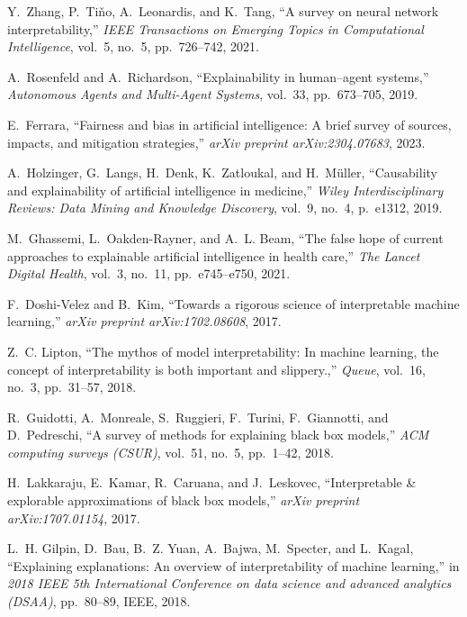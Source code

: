 \documentclass{article}
\begin{document}
\begin{thebibliography}{100}
	Y.~Zhang, P.~Ti{\v{n}}o, A.~Leonardis, and K.~Tang, ``A survey on neural
	network interpretability,'' {\em IEEE Transactions on Emerging Topics in
		Computational Intelligence}, vol.~5, no.~5, pp.~726--742, 2021.
	
	A.~Rosenfeld and A.~Richardson, ``Explainability in human--agent systems,''
	{\em Autonomous Agents and Multi-Agent Systems}, vol.~33, pp.~673--705, 2019.
	
	E.~Ferrara, ``Fairness and bias in artificial intelligence: A brief survey of
	sources, impacts, and mitigation strategies,'' {\em arXiv preprint
		arXiv:2304.07683}, 2023.
	
	A.~Holzinger, G.~Langs, H.~Denk, K.~Zatloukal, and H.~M{\"u}ller, ``Causability
	and explainability of artificial intelligence in medicine,'' {\em Wiley
		Interdisciplinary Reviews: Data Mining and Knowledge Discovery}, vol.~9,
	no.~4, p.~e1312, 2019.
	
	M.~Ghassemi, L.~Oakden-Rayner, and A.~L. Beam, ``The false hope of current
	approaches to explainable artificial intelligence in health care,'' {\em The
		Lancet Digital Health}, vol.~3, no.~11, pp.~e745--e750, 2021.
	
	F.~Doshi-Velez and B.~Kim, ``Towards a rigorous science of interpretable
	machine learning,'' {\em arXiv preprint arXiv:1702.08608}, 2017.
	
	Z.~C. Lipton, ``The mythos of model interpretability: In machine learning, the
	concept of interpretability is both important and slippery.,'' {\em Queue},
	vol.~16, no.~3, pp.~31--57, 2018.
	
	R.~Guidotti, A.~Monreale, S.~Ruggieri, F.~Turini, F.~Giannotti, and
	D.~Pedreschi, ``A survey of methods for explaining black box models,'' {\em
		ACM computing surveys (CSUR)}, vol.~51, no.~5, pp.~1--42, 2018.
	
	H.~Lakkaraju, E.~Kamar, R.~Caruana, and J.~Leskovec, ``Interpretable \&
	explorable approximations of black box models,'' {\em arXiv preprint
		arXiv:1707.01154}, 2017.
	
	L.~H. Gilpin, D.~Bau, B.~Z. Yuan, A.~Bajwa, M.~Specter, and L.~Kagal,
	``Explaining explanations: An overview of interpretability of machine
	learning,'' in {\em 2018 IEEE 5th International Conference on data science
		and advanced analytics (DSAA)}, pp.~80--89, IEEE, 2018.
	

\end{thebibliography}
\end{document}
